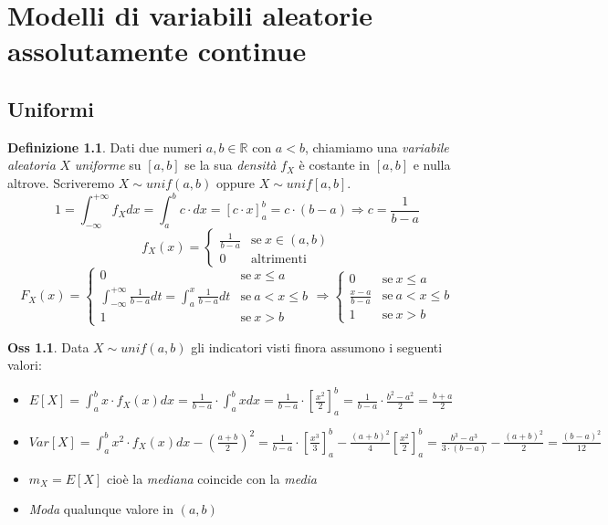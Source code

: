 \documentclass[12pt, a4paper]{report}
\theoremstyle{definition}
\newtheorem{definition}{Definizione}[section]
\newtheorem*{observation}{Oss}
\DeclareRobustCommand{\R}{\mathbb{R}}%
\begin{document}
\chapter{Modelli di variabili aleatorie assolutamente continue}

\section{Uniformi}
\begin{definition}
	Dati due numeri $a,b\in\R$ con $a<b$, chiamiamo una \emph{variabile aleatoria}
	$X$ \emph{uniforme} su $[a,b]$ se la sua \emph{densità} $f_X$ è costante in
	$[a,b]$ e nulla altrove. Scriveremo \(X\sim unif(a,b)\) oppure \(X\sim unif[a,b]\).
	\[1=\int_{-\infty}^{+\infty}f_Xdx=\int_a^bc\cdot dx=[c\cdot x]_a^b=c\cdot (b-a)\Rightarrow c=\frac{1}{b-a}\]
	\[f_X(x)=\begin{cases}
		{\frac{1}{b-a}} & \text{se}\ x\in(a,b)\\
		{0} & \text{altrimenti}
	\end{cases}\]
	\[F_X(x)=\begin{cases}
		{0} & \text{se}\ {x\leq a}\\
		{\int_{-\infty}^{+\infty}\frac{1}{b-a}dt=\int_a^x\frac{1}{b-a}dt} & 
			\text{se}\ {a<x\leq b}\\
		{1} & \text{se}\ {x>b}
	\end{cases}\Rightarrow\begin{cases}
		{0} & \text{se}\ {x\leq a}\\
		{\frac{x-a}{b-a}} & \text{se}\ {a<x\leq b}\\
		{1} & \text{se}\ {x>b}
	\end{cases}\]
\end{definition}

\begin{observation}
	Data $X\sim unif(a,b)$ gli indicatori visti finora assumono i seguenti valori:
	\begin{itemize}
		\item \(E[X]=\int_a^bx\cdot f_X(x)dx=\frac{1}{b-a}\cdot \int_a^bxdx=\frac{1}{b-a}\cdot \left[
			\frac{x^2}{2}\right]_a^b=\frac{1}{b-a}\cdot \frac{b^2-a^2}{2}=\frac{b+a}{2}\)
		\item \(Var[X]=\int_a^bx^2\cdot f_X(x)dx-\left(\frac{a+b}{2}\right)^2=\frac{1}{b-a}\cdot 
		\left[\frac{x^3}{3}\right]_a^b-\frac{(a+b)^2}{4}\left[\frac{x^2}{2}\right]_a^b
		=\frac{b^3-a^3}{3\cdot (b-a)}- \frac{(a+b)^2}{2}=\frac{(b-a)^2}{12}\)
		\item \(m_X=E[X]\) cioè la \emph{mediana} coincide con la \emph{media}
		\item \emph{Moda} qualunque valore in $(a,b)$
	\end{itemize}
\end{observation}
\end{document}
